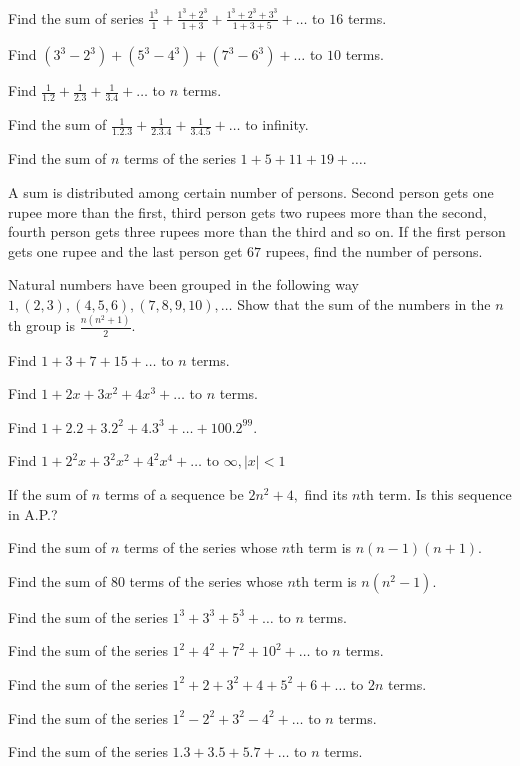 \item Find the sum of series $\frac{1^3}{1} + \frac{1^3 + 2^3}{1 + 3} + \frac{1^3 + 2^3 + 3^3}{1 + 3 + 5} + \ldots$ to $16$ terms.
\item Find $(3^3 - 2^3) + (5^3 - 4^3) + (7^3 - 6^3) + \ldots$ to $10$ terms.
\item Find $\frac{1}{1.2} + \frac{1}{2.3} + \frac{1}{3.4} + \ldots$ to $n$ terms.
\item Find the sum of $\frac{1}{1.2.3} + \frac{1}{2.3.4} + \frac{1}{3.4.5} + \ldots$ to infinity.
\item Find the sum of $n$ terms of the series $1 + 5 + 11 + 19 + \ldots$.
\item A sum is distributed among certain number of persons. Second person gets one rupee more than the first, third person
  gets two rupees more than the second, fourth person gets three rupees more than the third and so on. If the first person gets one
  rupee and the last person get $67$ rupees, find the number of persons.
\item Natural numbers have been grouped in the following way $1, (2, 3), (4, 5, 6), (7, 8, 9, 10), \ldots$ Show that the
  sum of the numbers in the $n$th group is $\frac{n(n^2 + 1)}{2}$.
\item Find $1 + 3 + 7 + 15 + \ldots$ to $n$ terms.
\item Find $1 + 2x + 3x^2 + 4x^3 + \ldots$ to $n$ terms.
\item Find $1 + 2.2 + 3.2^2 + 4.3^3 + \ldots + 100.2^{99}$.
\item Find $1 + 2^2x + 3^2x^2 + 4^2x^4 + \ldots \text{~to~}\infty, |x| < 1$
\item If the sum of $n$ terms of a sequence be $2n^2 + 4,$ find its $n$th term. Is this sequence in A.P.?
\item Find the sum of $n$ terms of the series whose $n$th term is $n(n - 1)(n + 1)$.
\item Find the sum of $80$ terms of the series whose $n$th term is $n(n^2 - 1)$.
\item Find the sum of the series $1^3 + 3^3 + 5^3 + \ldots$ to $n$ terms.
\item Find the sum of the series $1^2 + 4^2 + 7^2 + 10^2 + \ldots$ to $n$ terms.
\item Find the sum of the series $1^2 + 2 + 3^2 + 4 + 5^2 + 6 + \ldots$ to $2n$ terms.
\item Find the sum of the series $1^2 - 2^2 + 3^2 - 4^2 + \ldots$ to $n$ terms.
\item Find the sum of the series $1.3 + 3.5 + 5.7 + \ldots$ to $n$ terms.
